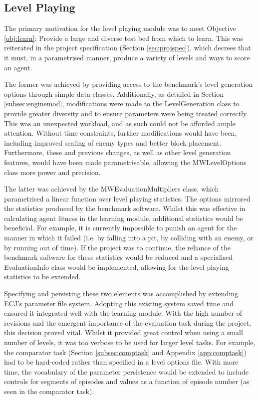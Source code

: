
\subsection{Level Playing}

The primary motivation for the level playing module was to meet Objective \ref{obj:learn}: Provide a large and diverse test bed from which to learn. This was reiterated in the project specification (Section \ref{sec:projspec}), which decrees that it must, in a parametrised manner, produce a variety of levels and ways to score an agent.

The former was achieved by providing access to the benchmark's level generation options through simple data classes. Additionally, as detailed in Section \ref{subsec:enginemod}, modifications were made to the LevelGeneration class to provide greater diversity and to ensure parameters were being treated correctly. This was an unexpected workload, and as such could not be afforded ample attention. Without time constraints, further modifications would have been, including improved scaling of enemy types and better block placement. Furthermore, these and previous changes, as well as other level generation features, would have been made parametrisable, allowing the MWLevelOptions class more power and precision.

The latter was achieved by the MWEvaluationMultipliers class, which parametrised a linear function over level playing statistics. The options mirrored the statistics produced by the benchmark software. Whilst this was effective in calculating agent fitness in the learning module, additional statistics would be beneficial. For example, it is currently impossible to punish an agent for the manner in which it failed (i.e. by falling into a pit, by colliding with an enemy, or by running out of time). If the project was to continue, the reliance of the benchmark software for these statistics would be reduced and a specialised EvaluationInfo class would be implemented, allowing for the level playing statistics to be extended.

Specifying and persisting these two elements was accomplished by extending ECJ's parameter file system. Adopting this existing system saved time and ensured it integrated well with the learning module. With the high number of revisions and the emergent importance of the evaluation task during the project, this decision proved vital. Whilst it provided great control when using a small number of levels, it was too verbose to be used for larger level tasks. For example, the comparator task (Section \ref{subsec:comptask} and Appendix \ref{app:comptask}) had to be hard-coded rather than specified in a level options file. With more time, the vocabulary of the parameter persistence would be extended to include controls for segments of episodes and values as a function of episode number (as seen in the comparator task).

